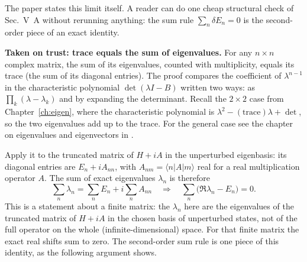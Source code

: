 The paper states this limit itself. A reader can do one cheap structural check of Sec.~V~A without rerunning anything: the sum rule $\sum_n\delta E_n=0$ is the second-order piece of an exact identity.

\begin{beyond}
\textbf{Taken on trust: trace equals the sum of eigenvalues.} For any $n\times n$ complex matrix, the sum of its eigenvalues, counted with multiplicity, equals its trace (the sum of its diagonal entries). The proof compares the coefficient of $\lambda^{n-1}$ in the characteristic polynomial $\det(\lambda I-B)$ written two ways: as $\prod_k(\lambda-\lambda_k)$ and by expanding the determinant. Recall the $2\times2$ case from Chapter~\ref{ch:eigen}, where the characteristic polynomial is $\lambda^2-(\text{trace})\lambda+\det$, so the two eigenvalues add up to the trace. For the general case see the chapter on eigenvalues and eigenvectors in \cite{strang}.
\end{beyond}

Apply it to the truncated matrix of $H+iA$ in the unperturbed eigenbasis: its diagonal entries are $E_n+iA_{nn}$, with $A_{nm}=\langle n|A|m\rangle$ real for a real multiplication operator $A$. The sum of exact eigenvalues $\lambda_n$ is therefore
\begin{equation}
\sum_n\lambda_n=\sum_n E_n+i\sum_n A_{nn}
\quad\Longrightarrow\quad
\sum_n\bigl(\Re\lambda_n-E_n\bigr)=0 .
\label{eq:paper-critique-trace}
\end{equation}
This is a statement about a finite matrix: the $\lambda_n$ here are the eigenvalues of the truncated matrix of $H+iA$ in the chosen basis of unperturbed states, not of the full operator on the whole (infinite-dimensional) space. For that finite matrix the exact real shifts sum to zero. The second-order sum rule is one piece of this identity, as the following argument shows.

